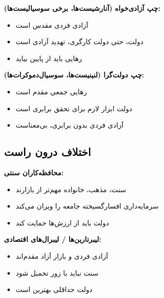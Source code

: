 \begin{debatebox}
	\textbf{چپ آزادی‌خواه (آنارشیست‌ها، برخی سوسیالیست‌ها):}
	\begin{itemize}[nosep]
		\item آزادی فردی مقدس است
		\item دولت، حتی دولت کارگری، تهدید آزادی است
		\item رهایی باید از پایین بیاید
	\end{itemize}
	
	\textbf{چپ دولت‌گرا (لنینیست‌ها، سوسیال‌دموکرات‌ها):}
	\begin{itemize}[nosep]
		\item رهایی جمعی مقدم است
		\item دولت ابزار لازم برای تحقق برابری است
		\item آزادی فردی بدون برابری، بی‌معناست
	\end{itemize}
\end{debatebox}

\subsection{اختلاف درون راست}

\begin{debatebox}
	\textbf{محافظه‌کاران سنتی:}
	\begin{itemize}[nosep]
		\item سنت، مذهب، خانواده مهم‌تر از بازارند
		\item سرمایه‌داری افسارگسیخته جامعه را ویران می‌کند
		\item دولت باید از ارزش‌ها حمایت کند
	\end{itemize}
	
	\textbf{لیبرتارین‌ها / لیبرال‌های اقتصادی:}
	\begin{itemize}[nosep]
		\item آزادی فردی و بازار آزاد مقدم‌اند
		\item سنت نباید با زور تحمیل شود
		\item دولت حداقلی بهترین است
	\end{itemize}
\end{debatebox}

\vspace{-4pt}

